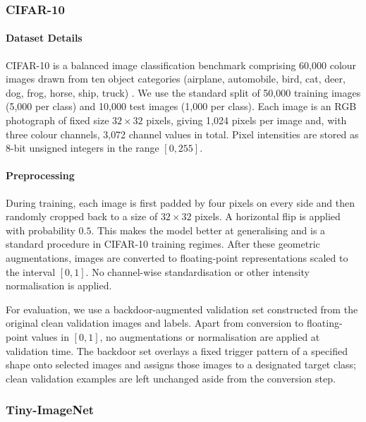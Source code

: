 \documentclass{article}
\theoremstyle{plain}
\theoremstyle{definition}
\theoremstyle{remark}
\begin{document}
\subsubsection{CIFAR-10}
\label{cifarapp}
\paragraph{Dataset Details}
CIFAR-10 is a balanced image classification benchmark comprising 60{,}000 colour images drawn from ten object categories (airplane, automobile, bird, cat, deer, dog, frog, horse, ship, truck) \cite{krizhevsky_learning_2009}. We use the standard split of 50{,}000 training images (5{,}000 per class) and 10{,}000 test images (1{,}000 per class). Each image is an RGB photograph of fixed size $32 \times 32$ pixels, giving 1{,}024 pixels per image and, with three colour channels, 3{,}072 channel values in total. Pixel intensities are stored as 8-bit unsigned integers in the range $[0, 255]$. 

\paragraph{Preprocessing}
During training, each image is first padded by four pixels on every side and then randomly cropped back to a size of $32\times 32$ pixels. A horizontal flip is applied with probability $0.5$. This makes the model better at generalising and is a standard procedure in CIFAR-10 training regimes. After these geometric augmentations, images are converted to floating-point representations scaled to the interval $[0,1]$. No channel-wise standardisation or other intensity normalisation is applied.

For evaluation, we use a backdoor-augmented validation set constructed from the original clean validation images and labels. Apart from conversion to floating-point values in $[0,1]$, no augmentations or normalisation are applied at validation time. The backdoor set overlays a fixed trigger pattern of a specified shape onto selected images and assigns those images to a designated target class; clean validation examples are left unchanged aside from the conversion step.



\subsubsection{Tiny-ImageNet}
\label{tinyapp}
\end{document}
